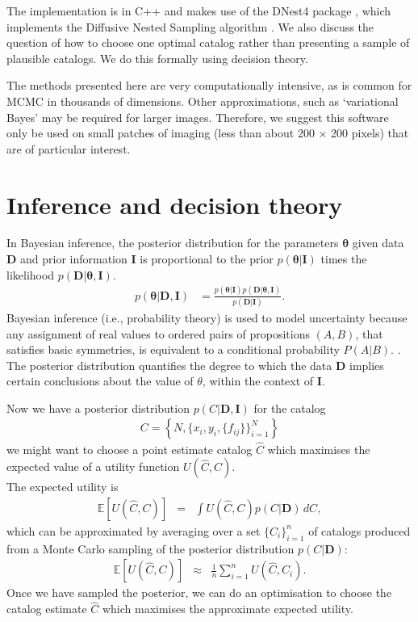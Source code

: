 \documentclass[a4paper,fleqn,usenatbib]{mnras}
\newcommand{\params}{\boldsymbol{\theta}}
\newcommand{\data}{\boldsymbol{D}}
\newcommand{\info}{\boldsymbol{I}}
\begin{document}
The implementation is in C++ and makes use of the DNest4 package
\citep{dnest4}, which implements the Diffusive Nested Sampling algorithm
\citep{dns}. We also discuss the question of how to choose one optimal catalog
rather than presenting a sample of plausible catalogs. We do this formally
using decision theory.

The methods presented here are very computationally intensive, as is common
for MCMC in thousands of dimensions. Other approximations, such as
`variational Bayes' \citep[as used by e.g.,][]{regier2016learning} may be
required for larger images. Therefore, we suggest this software only be used
on small patches of imaging (less than about 200 $\times$ 200 pixels) that
are of particular interest.


\section{Inference and decision theory}
In Bayesian inference, the posterior distribution for the parameters
$\params$ given data $\data$ and prior information $\info$ is proportional
to the prior $p(\params | \info)$
times the likelihood $p(\data | \params, \info)$.
\begin{align}
p(\params | \data, \info) &=
    \frac{p(\params | \info)p(\data | \params, \info)}{p(\data | \info)}.
\end{align}
Bayesian inference (i.e., probability theory) is used to model uncertainty
because any assignment of real values to
ordered pairs of propositions $(A, B)$, that satisfies basic
symmetries, is equivalent to a conditional probability $P(A | B)$.
\citep{knuth2012foundations}. The posterior distribution quantifies the degree
to which the data $\data$ implies certain conclusions about the value of
$\theta$, within the context of $\info$.

Now we have a posterior distribution $p(C|\data, \info)$ for the catalog
\begin{eqnarray}
C = \left\{N,\{x_i, y_i, \{f_{ij}\}\}_{i=1}^N \right\}
\end{eqnarray}
we might want to choose a point estimate catalog $\hat{C}$ which
maximises the expected value of a utility function $U(\hat{C}, C)$.\\

The expected utility is
\begin{eqnarray}
\mathds{E}\left[U(\hat{C}, C)\right]
&=&
\int U(\hat{C}, C) p(C | \data) \, dC,
\end{eqnarray}
which can be approximated by averaging over a set $\{C_i\}_{i=1}^n$
of catalogs produced from a Monte Carlo sampling of the posterior distribution
$p(C|\data)$:
\begin{eqnarray}
\mathds{E}\left[U(\hat{C}, C)\right]
&\approx&
\frac{1}{n} \sum_{i=1}^n U(\hat{C}, C_i).
\end{eqnarray}
Once we have sampled the posterior, we can do an optimisation to choose the
catalog estimate $\hat{C}$ which maximises the approximate expected utility.
\end{document}
